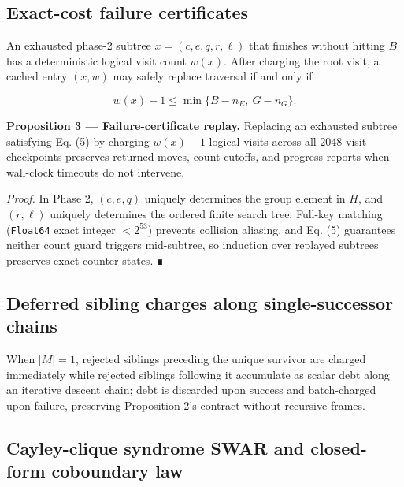 \documentclass[10pt,twocolumn,letterpaper]{article}
\begin{document}
\hypertarget{exact-cost-failure-certificates}{%
\subsection{Exact-cost failure certificates}\label{exact-cost-failure-certificates}}

An exhausted phase-2 subtree \(x=(c,e,q,r,\ell)\) that finishes without
hitting \(B\) has a deterministic logical visit count \(w(x)\). After
charging the root visit, a cached entry \((x,w)\) may safely replace
traversal if and only if

\[
w(x)-1\le\min\{B-n_E,\ G-n_G\}.
\tag{5}
\]

\textbf{Proposition 3 --- Failure-certificate replay.} Replacing an
exhausted subtree satisfying Eq. (5) by charging \(w(x)-1\) logical
visits across all \(2048\)-visit checkpoints preserves returned moves,
count cutoffs, and progress reports when wall-clock timeouts do not
intervene.

\emph{Proof.} In Phase 2, \((c,e,q)\) uniquely determines the group
element in \(H\), and \((r,\ell)\) uniquely determines the ordered
finite search tree. Full-key matching (\texttt{Float64} exact integer
\(<2^{53}\)) prevents collision aliasing, and Eq. (5) guarantees neither
count guard triggers mid-subtree, so induction over replayed subtrees
preserves exact counter states. ∎

\hypertarget{deferred-sibling-charges-along-single-successor-chains}{%
\subsection{Deferred sibling charges along single-successor chains}\label{deferred-sibling-charges-along-single-successor-chains}}

When \(|M|=1\), rejected siblings preceding the unique survivor are
charged immediately while rejected siblings following it accumulate as
scalar debt along an iterative descent chain; debt is discarded upon
success and batch-charged upon failure, preserving Proposition 2's
contract without recursive frames.

\hypertarget{cayley-clique-syndrome-swar-and-closed-form-coboundary-law}{%
\subsection{Cayley-clique syndrome SWAR and closed-form coboundary law}\label{cayley-clique-syndrome-swar-and-closed-form-coboundary-law}}
\end{document}
